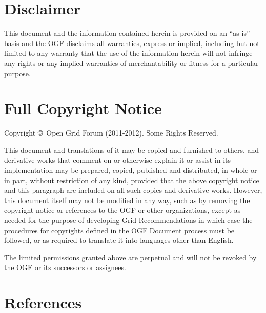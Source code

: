 \documentclass[10pt]{article}
\newcommand{\copyrightyears}{2011-2012}
\begin{document}
\section{Disclaimer}

This document and the information contained herein is provided on an \enquote{as-is} basis and the OGF disclaims all warranties, express or implied, including but not limited to any warranty that the use of the information herein will not infringe any rights or any implied warranties of merchantability or fitness for a particular purpose.

\section{Full Copyright Notice}

Copyright \copyright \ Open Grid Forum (\copyrightyears). Some Rights Reserved.

This document and translations of it may be copied and furnished to others, and derivative works that comment on or otherwise explain it or assist in its implementation may be prepared, copied, published and distributed, in whole or in part, without restriction of any kind, provided that the above copyright notice and this paragraph are included on all such copies and derivative works. However, this document itself may not be modified in any way, such as by removing the copyright notice or references to the OGF or other organizations, except as needed for the purpose of developing Grid Recommendations in which case the procedures for copyrights defined in the OGF Document process must be followed, or as required to translate it into languages other than English.

The limited permissions granted above are perpetual and will not be revoked by the OGF or its successors or assignees.

\section{References}
\renewcommand{\refname}{}
\vspace*{-3em}

\end{document}
